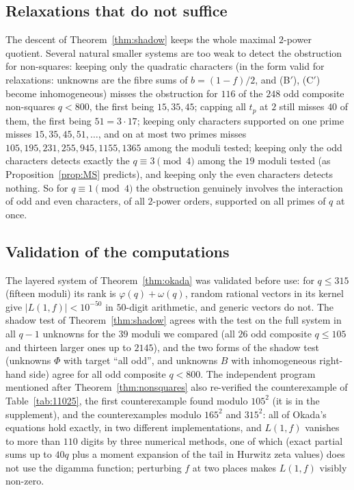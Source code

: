 \documentclass[11pt]{amsart}
\theoremstyle{definition}
\theoremstyle{remark}
\numberwithin{equation}{section}
\begin{document}
\subsection{Relaxations that do not suffice}
The descent of Theorem~\ref{thm:shadow} keeps the whole maximal $2$-power quotient.
Several natural smaller systems are too weak to detect the obstruction for non-squares:
keeping only the quadratic characters (in the form valid for relaxations: unknowns are the fibre sums of $b=(1-f)/2$, and (B$'$), (C$'$) become inhomogeneous) misses the obstruction for $116$ of the $248$ odd composite non-squares $q<800$, the first being $15,35,45$; capping all $t_p$ at $2$ still misses $40$ of them, the first being $51=3\cdot17$;
keeping only characters supported on one prime misses $15,35,45,51,\dots$, and on at most two primes misses $105,195,231,255,945,1155,1365$ among the moduli tested;
keeping only the odd characters detects exactly the $q\equiv3\pmod4$ among the $19$ moduli tested (as Proposition~\ref{prop:MS} predicts), and keeping only the even characters detects nothing.
So for $q\equiv1\pmod4$ the obstruction genuinely involves the interaction of odd and even characters, of all $2$-power orders, supported on all primes of $q$ at once.

\subsection{Validation of the computations}
The layered system of Theorem~\ref{thm:okada} was validated before use: for $q\le315$ (fifteen moduli) its rank is $\varphi(q)+\omega(q)$, random rational vectors in its kernel give $|L(1,f)|<10^{-50}$ in $50$-digit arithmetic, and generic vectors do not.
The shadow test of Theorem~\ref{thm:shadow} agrees with the test on the full system in all $q-1$ unknowns for the $39$ moduli we compared (all $26$ odd composite $q\le105$ and thirteen larger ones up to $2145$), and the two forms of the shadow test (unknowns $\Phi$ with target ``all odd'', and unknowns $B$ with inhomogeneous right-hand side) agree for all odd composite $q<800$.
The independent program mentioned after Theorem~\ref{thm:nonsquares} also re-verified the counterexample of Table~\ref{tab:11025}, the first counterexample found modulo $105^2$ (it is in the supplement), and the counterexamples modulo $165^2$ and $315^2$: all of Okada's equations hold exactly, in two different implementations, and $L(1,f)$ vanishes to more than $110$ digits by three numerical methods, one of which (exact partial sums up to $40q$ plus a moment expansion of the tail in Hurwitz zeta values) does not use the digamma function; perturbing $f$ at two places makes $L(1,f)$ visibly non-zero.
\end{document}
